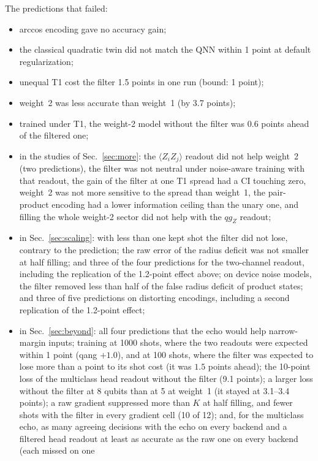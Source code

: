 \documentclass[11pt]{article}
\newcommand{\qZ}{qg_Z}
\begin{document}
The predictions that failed:
\begin{itemize}
\item arccos encoding gave no accuracy gain;
\item the classical quadratic twin did not match the QNN within 1 point at default regularization;
\item unequal T1 cost the filter 1.5 points in one run (bound: 1 point);
\item weight~2 was less accurate than weight~1 (by 3.7 points);
\item trained under T1, the weight-2 model without the filter was 0.6 points ahead of the filtered one;
\item in the studies of Sec.~\ref{sec:more}: the $\langle Z_iZ_j\rangle$ readout did not help weight~2 (two
  predictions), the filter was not neutral under noise-aware training with that readout, the gain of the
  filter at one T1 spread had a CI touching zero, weight~2 was not more sensitive to the spread than
  weight~1, the pair-product encoding had a lower information ceiling than the unary one, and filling the whole
  weight-2 sector did not help with the $\qZ$ readout;
\item in Sec.~\ref{sec:scaling}: with less than one kept shot the filter did not lose, contrary to the
  prediction; the raw error of the radius deficit was not smaller at half filling; and three of the four
  predictions for the two-channel readout, including the replication of the 1.2-point effect above; on device
  noise models, the filter removed less than half of the false radius deficit of product states; and three of
  five predictions on distorting encodings, including a second replication of the 1.2-point effect;
\item in Sec.~\ref{sec:beyond}: all four predictions that the echo would help narrow-margin inputs; training at 1000
  shots, where the two readouts were expected within 1 point (qang $+1.0$), and at 100 shots, where the filter was
  expected to lose more than a point to its shot cost (it was $1.5$ points ahead); the 10-point loss of the multiclass
  head readout without the filter (9.1 points); a larger loss without the filter at 8 qubits than at 5 at weight~1
  (it stayed at 3.1--3.4 points); a raw gradient suppressed more than $K$ at half filling, and fewer shots with the
  filter in every gradient cell (10 of 12); and, for the multiclass echo, as many agreeing decisions with the echo on
  every backend and a filtered head readout at least as accurate as the raw one on every backend (each missed on one

\end{itemize}
\end{document}
